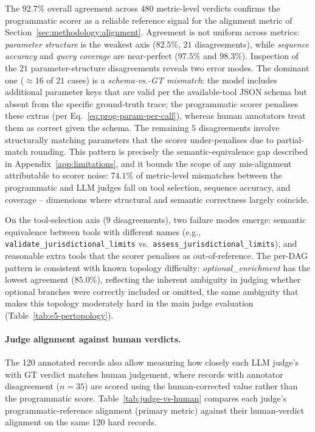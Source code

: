 The $92.7\%$ overall agreement across $480$ metric-level verdicts confirms the programmatic scorer as a reliable reference signal for the alignment metric of Section~\ref{sec:methodology:alignment}. Agreement is not uniform across metrics: \emph{parameter structure} is the weakest axis ($82.5\%$, $21$ disagreements), while \emph{sequence accuracy} and \emph{query coverage} are near-perfect ($97.5\%$ and $98.3\%$). Inspection of the $21$ parameter-structure disagreements reveals two error modes. The dominant one (${\approx}16$ of $21$ cases) is a \emph{schema-vs.-GT mismatch}: the model includes additional parameter keys that are valid per the available-tool JSON schema but absent from the specific ground-truth trace; the programmatic scorer penalises these extras (per Eq.~\ref{eq:prog-param-per-call}), whereas human annotators treat them as correct given the schema. The remaining $5$ disagreements involve structurally matching parameters that the scorer under-penalises due to partial-match rounding. This pattern is precisely the semantic-equivalence gap described in Appendix~\ref{app:limitations}, and it bounds the scope of any mis-alignment attributable to scorer noise: $74.1\%$ of metric-level mismatches between the programmatic and LLM judges fall on tool selection, sequence accuracy, and coverage -- dimensions where structural and semantic correctness largely coincide.

On the tool-selection axis ($9$ disagreements), two failure modes emerge: semantic equivalence between tools with different names (e.g., \texttt{validate\_jurisdictional\_limits} vs.\ \texttt{assess\_jurisdictional\_limits}), and reasonable extra tools that the scorer penalises as out-of-reference. The per-DAG pattern is consistent with known topology difficulty: \emph{optional\_enrichment} has the lowest agreement ($85.0\%$), reflecting the inherent ambiguity in judging whether optional branches were correctly included or omitted, the same ambiguity that makes this topology moderately hard in the main judge evaluation (Table~\ref{tab:e5-pertopology}).

\paragraph{Judge alignment against human verdicts.}
The 120 annotated records also allow measuring how closely each LLM judge's with GT verdict matches human judgement, where records with annotator disagreement ($n{=}35$) are scored using the human-corrected value rather than the programmatic score. Table~\ref{tab:judge-vs-human} compares each judge's programmatic-reference alignment (primary metric) against their human-verdict alignment on the same 120 hard records.

